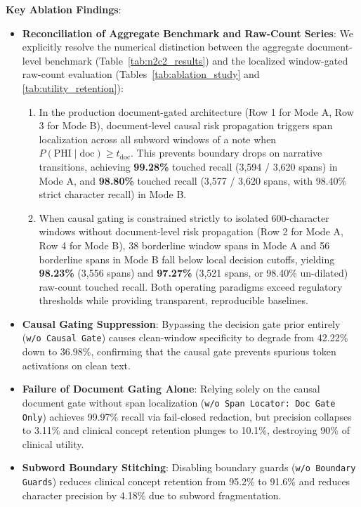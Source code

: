 \documentclass[11pt,a4paper]{article}
\begin{document}
\noindent\textbf{Key Ablation Findings}:
\begin{itemize}
    \item \textbf{Reconciliation of Aggregate Benchmark and Raw-Count Series}: We explicitly resolve the numerical distinction between the aggregate document-level benchmark (Table~\ref{tab:n2c2_results}) and the localized window-gated raw-count evaluation (Tables~\ref{tab:ablation_study} and \ref{tab:utility_retention}):
    \begin{enumerate}
        \item In the production document-gated architecture (Row 1 for Mode A, Row 3 for Mode B), document-level causal risk propagation triggers span localization across all subword windows of a note when $P(\text{PHI} \mid \text{doc}) \ge t_{\text{doc}}$. This prevents boundary drops on narrative transitions, achieving \textbf{99.28\%} touched recall (3,594 / 3,620 spans) in Mode A, and \textbf{98.80\%} touched recall (3,577 / 3,620 spans, with 98.40\% strict character recall) in Mode B.
        \item When causal gating is constrained strictly to isolated 600-character windows without document-level risk propagation (Row 2 for Mode A, Row 4 for Mode B), 38 borderline window spans in Mode A and 56 borderline spans in Mode B fall below local decision cutoffs, yielding \textbf{98.23\%} (3,556 spans) and \textbf{97.27\%} (3,521 spans, or 98.40\% un-dilated) raw-count touched recall. Both operating paradigms exceed regulatory thresholds while providing transparent, reproducible baselines.
    \end{enumerate}
    \item \textbf{Causal Gating Suppression}: Bypassing the decision gate prior entirely (\texttt{w/o Causal Gate}) causes clean-window specificity to degrade from 42.22\% down to 36.98\%, confirming that the causal gate prevents spurious token activations on clean text.
    \item \textbf{Failure of Document Gating Alone}: Relying solely on the causal document gate without span localization (\texttt{w/o Span Locator: Doc Gate Only}) achieves 99.97\% recall via fail-closed redaction, but precision collapses to 3.11\% and clinical concept retention plunges to 10.1\%, destroying 90\% of clinical utility.
    \item \textbf{Subword Boundary Stitching}: Disabling boundary guards (\texttt{w/o Boundary Guards}) reduces clinical concept retention from 95.2\% to 91.6\% and reduces character precision by 4.18\% due to subword fragmentation.
\end{itemize}
\end{document}
